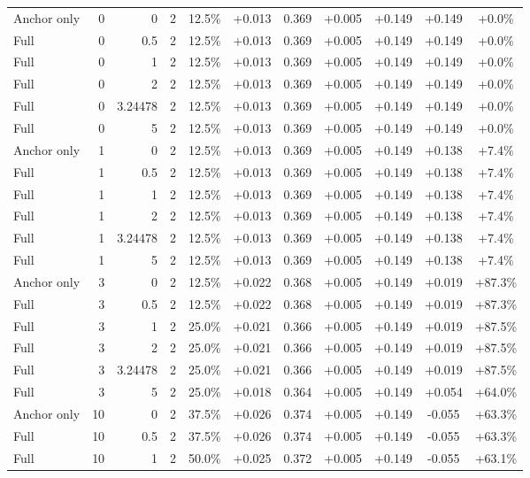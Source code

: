 \begin{table}[htbp]
\begin{tabular}{lrrrccccccc}
Anchor only & 0 & 0 & 2 & 12.5\% & +0.013 & 0.369 & +0.005 & +0.149 & +0.149 & +0.0\% \\
Full & 0 & 0.5 & 2 & 12.5\% & +0.013 & 0.369 & +0.005 & +0.149 & +0.149 & +0.0\% \\
Full & 0 & 1 & 2 & 12.5\% & +0.013 & 0.369 & +0.005 & +0.149 & +0.149 & +0.0\% \\
Full & 0 & 2 & 2 & 12.5\% & +0.013 & 0.369 & +0.005 & +0.149 & +0.149 & +0.0\% \\
Full & 0 & 3.24478 & 2 & 12.5\% & +0.013 & 0.369 & +0.005 & +0.149 & +0.149 & +0.0\% \\
Full & 0 & 5 & 2 & 12.5\% & +0.013 & 0.369 & +0.005 & +0.149 & +0.149 & +0.0\% \\
Anchor only & 1 & 0 & 2 & 12.5\% & +0.013 & 0.369 & +0.005 & +0.149 & +0.138 & +7.4\% \\
Full & 1 & 0.5 & 2 & 12.5\% & +0.013 & 0.369 & +0.005 & +0.149 & +0.138 & +7.4\% \\
Full & 1 & 1 & 2 & 12.5\% & +0.013 & 0.369 & +0.005 & +0.149 & +0.138 & +7.4\% \\
Full & 1 & 2 & 2 & 12.5\% & +0.013 & 0.369 & +0.005 & +0.149 & +0.138 & +7.4\% \\
Full & 1 & 3.24478 & 2 & 12.5\% & +0.013 & 0.369 & +0.005 & +0.149 & +0.138 & +7.4\% \\
Full & 1 & 5 & 2 & 12.5\% & +0.013 & 0.369 & +0.005 & +0.149 & +0.138 & +7.4\% \\
Anchor only & 3 & 0 & 2 & 12.5\% & +0.022 & 0.368 & +0.005 & +0.149 & +0.019 & +87.3\% \\
Full & 3 & 0.5 & 2 & 12.5\% & +0.022 & 0.368 & +0.005 & +0.149 & +0.019 & +87.3\% \\
Full & 3 & 1 & 2 & 25.0\% & +0.021 & 0.366 & +0.005 & +0.149 & +0.019 & +87.5\% \\
Full & 3 & 2 & 2 & 25.0\% & +0.021 & 0.366 & +0.005 & +0.149 & +0.019 & +87.5\% \\
Full & 3 & 3.24478 & 2 & 25.0\% & +0.021 & 0.366 & +0.005 & +0.149 & +0.019 & +87.5\% \\
Full & 3 & 5 & 2 & 25.0\% & +0.018 & 0.364 & +0.005 & +0.149 & +0.054 & +64.0\% \\
Anchor only & 10 & 0 & 2 & 37.5\% & +0.026 & 0.374 & +0.005 & +0.149 & -0.055 & +63.3\% \\
Full & 10 & 0.5 & 2 & 37.5\% & +0.026 & 0.374 & +0.005 & +0.149 & -0.055 & +63.3\% \\
Full & 10 & 1 & 2 & 50.0\% & +0.025 & 0.372 & +0.005 & +0.149 & -0.055 & +63.1\% \\

\end{tabular}
\end{table}
